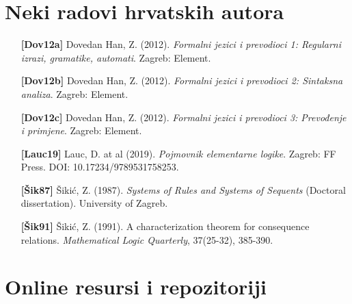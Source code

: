 \section{Neki radovi hrvatskih autora}


\begin{itemize}[leftmargin=2cm, labelsep=0.5cm, itemsep=0.3cm]


\item[\textbf{[Dov12a]}] Dovedan Han, Z. (2012). \textit{Formalni jezici i prevodioci 1: Regularni izrazi, gramatike, automati}. Zagreb: Element.

\item[\textbf{[Dov12b]}] Dovedan Han, Z. (2012). \textit{Formalni jezici i prevodioci 2: Sintaksna analiza}. Zagreb: Element.

\item[\textbf{[Dov12c]}] Dovedan Han, Z. (2012). \textit{Formalni jezici i prevodioci 3: Prevođenje i primjene}. Zagreb: Element.

\item[\textbf{[Lauc19]}] Lauc, D. at al (2019). \textit{Pojmovnik elementarne logike}. Zagreb: FF Press. DOI: 10.17234/9789531758253.

\item[\textbf{[Šik87]}] Šikić, Z. (1987). \textit{Systems of Rules and Systems of Sequents} (Doctoral dissertation). University of Zagreb.

\item[\textbf{[Šik91]}] Šikić, Z. (1991). A characterization theorem for consequence relations. \textit{Mathematical Logic Quarterly}, 37(25-32), 385-390.

\end{itemize}


\section{Online resursi i repozitoriji}

